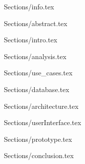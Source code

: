 \documentclass[12pt]{article}
\begin{document}
 {Sections/info.tex}
\maketitle

 {Sections/abstract.tex}

\tableofcontents

\newpage

 {Sections/intro.tex}

 {Sections/analysis.tex}

 {Sections/use_cases.tex}

 {Sections/database.tex}

 {Sections/architecture.tex}

 {Sections/userInterface.tex}

 {Sections/prototype.tex}

 {Sections/conclusion.tex}

\appendix
 

\end{document}
